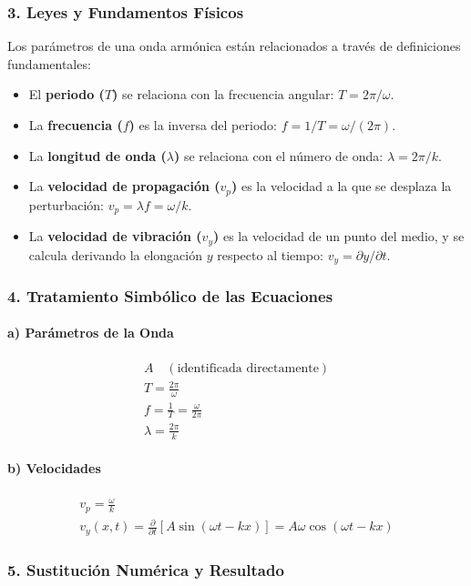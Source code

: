 \subsubsection*{3. Leyes y Fundamentos Físicos}
Los parámetros de una onda armónica están relacionados a través de definiciones fundamentales:
\begin{itemize}
    \item El \textbf{periodo ($T$)} se relaciona con la frecuencia angular: $T = 2\pi / \omega$.
    \item La \textbf{frecuencia ($f$)} es la inversa del periodo: $f = 1/T = \omega / (2\pi)$.
    \item La \textbf{longitud de onda ($\lambda$)} se relaciona con el número de onda: $\lambda = 2\pi / k$.
    \item La \textbf{velocidad de propagación ($v_p$)} es la velocidad a la que se desplaza la perturbación: $v_p = \lambda f = \omega / k$.
    \item La \textbf{velocidad de vibración ($v_y$)} es la velocidad de un punto del medio, y se calcula derivando la elongación $y$ respecto al tiempo: $v_y = \partial y / \partial t$.
\end{itemize}

\subsubsection*{4. Tratamiento Simbólico de las Ecuaciones}
\paragraph*{a) Parámetros de la Onda}
\begin{gather}
    A \quad (\text{identificada directamente}) \\
    T = \frac{2\pi}{\omega} \\
    f = \frac{1}{T} = \frac{\omega}{2\pi} \\
    \lambda = \frac{2\pi}{k}
\end{gather}
\paragraph*{b) Velocidades}
\begin{gather}
    v_p = \frac{\omega}{k} \\
    v_y(x,t) = \frac{\partial}{\partial t} [A \sin(\omega t - kx)] = A\omega \cos(\omega t - kx)
\end{gather}

\subsubsection*{5. Sustitución Numérica y Resultado}
